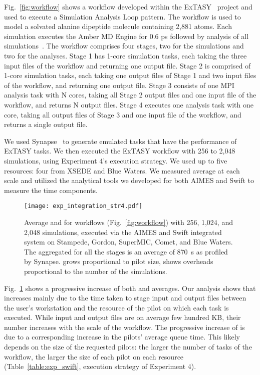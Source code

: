 \documentclass[10pt, conference, compsocconf]{IEEEtran}
\begin{document}
Fig.~\ref{fig:workflow} shows a workflow developed within the
ExTASY~\cite{balasubramanian2016extasy} project and used to execute a
Simulation Analysis Loop pattern. The workflow is used to model a solvated
alanine dipeptide molecule containing 2,881 atoms. Each simulation executes
the Amber MD Engine for 0.6 ps followed by analysis of all
simulations~\cite{balasubramanian2016ensemble}.  The workflow comprises four
stages, two for the simulations and two for the analyses. Stage 1 has
 1-core simulation tasks, each taking the three input files of the
workflow and returning one output file. Stage 2 is comprised of  1-core
simulation tasks, each taking one output files of Stage 1 and two input files
of the workflow, and returning one output file. Stage 3 consists of one MPI
analysis task with N cores, taking all Stage 2 output files and one input
file of the workflow, and returns N output files. Stage 4 executes one
analysis task with one core, taking all output files of Stage 3 and one input
file of the workflow, and returns a single output file.

We used Synapse~\cite{merzky2016synapse} to generate emulated tasks that have
the performance of ExTASY
tasks.  We then executed the ExTASY workflow with 256 to 2,048 simulations,
using Experiment 4's execution strategy. We used up to five resources: four
from XSEDE and Blue Waters. We measured average  at each scale and
utilized the analytical tools we developed for both AIMES and Swift to
measure the  time components.

\begin{figure}
  \centering
  \texttt{[image: exp\_integration\_str4.pdf]}
  \caption{ Average  and  for workflows
            (Fig.~\ref{fig:workflow}) with 256, 1,024, and 2,048 simulations,
            executed via the AIMES and Swift integrated system on Stampede,
            Gordon, SuperMIC, Comet, and Blue Waters. The aggregated
             for all the stages is an average of 870~s as profiled
            by Synapse.  grows proportional to pilot size, 
            shows  overheads proportional to the number of the
            simulations.}\label{fig:workflow_results}
\end{figure}

Fig.~\ref{fig:workflow_results} shows a progressive increase of both 
and  averages. Our analysis shows that  increases mainly due to
the time taken to stage input and output files between the user's workstation
and the resource of the pilot on which each task is executed. While input and
output files are on average few hundred KB, their number increases with the
scale of the workflow. The progressive increase of  is due to a
corresponding increase in the pilots' average queue time. This likely depends
on the size of the requested pilots: the larger the number of tasks of the
workflow, the larger the size of each pilot on each resource
(Table~\ref{table:exp_swift}, execution strategy of Experiment 4).
\end{document}
